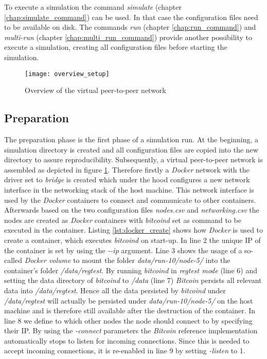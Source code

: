 To execute a simulation the command \textit{simulate} (chapter \ref{chap:simulate_command}) can be used.
In that case the configuration files need to be available on disk.
The commands \textit{run} (chapter \ref{chap:run_command}) and \textit{multi-run} (chapter \ref{chap:multi_run_command}) provide another possibility to execute a simulation, creating all configuration files before starting the simulation. 

\begin{figure}[t]
\texttt{[image: overview\_setup]}
\centering
\caption{Overview of the virtual peer-to-peer network}
\label{fig:overview}
\end{figure}

\subsection{Preparation}

The preparation phase is the first phase of a simulation run.
At the beginning, a simulation directory is created and all configuration files are copied into the new directory to assure reproducibility.
Subsequently, a virtual peer-to-peer network is assembled as depicted in figure \ref{fig:overview}.
Therefore firstly a \textit{Docker} network with the driver set to \textit{bridge} is created which under the hood configures a new network interface in the networking stack of the host machine.
This network interface is used by the \textit{Docker} containers to connect and communicate to other containers.
Afterwards based on the two configuration files \textit{nodes.csv} and \textit{networking.csv} the nodes are created as \textit{Docker} containers with \textit{bitcoind} set as command to be executed in the container.
Listing \ref{lst:docker_create} shows how \textit{Docker} is used to create a container, which executes \textit{bitcoind} on start-up.
In line 2 the unique IP of the container is set by using the \textit{-{}-ip} argument.
Line 3 shows the usage of a so-called \textit{Docker volume} to mount the folder \textit{data/run-10/node-5/} into the container's folder \textit{/data/regtest}.
By running \textit{bitcoind} in \textit{regtest mode} (line 6) and setting the data directory of \textit{bitcoind} to \textit{/data} (line 7) \textit{Bitcoin} persists all relevant data into \textit{/data/regtest}.
Hence all the data persisted by \textit{bitcoind} under \textit{/data/regtest} will actually be persisted under \textit{data/run-10/node-5/} on the host machine and is therefore still available after the destruction of the container.
In line 8 we define to which other nodes the node should connect to by specifying their IP.
By using the \textit{-connect} parameters the \textit{Bitcoin} reference implementation automatically stops to listen for incoming connections.
Since this is needed to accept incoming connections, it is re-enabled in line 9 by setting \textit{-listen} to 1.

